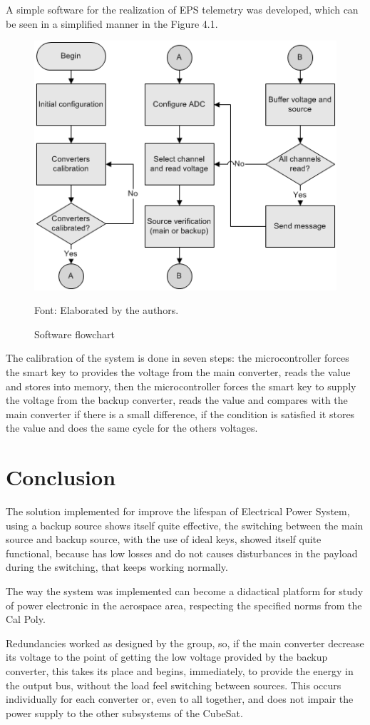 \documentclass[3p]{elsarticle}
\begin{document}
	A simple software for the realization of EPS telemetry was developed, which can be seen in a simplified manner in the Figure 4.1.
	
	\begin{figure}[th]
		\label{flow}
		\centering
		\includegraphics[width=0.4\linewidth]{./figs/fluxo2}
		\caption{Software flowchart}
		
		\begin{footnotesize}
		Font: Elaborated by the authors.
		\end{footnotesize}
	\end{figure}

	The calibration of the system is done in seven steps: the microcontroller forces the smart key to provides the voltage from the main converter, reads the value and stores into memory, then the microcontroller forces the smart key to supply the voltage from the backup converter, reads the value and compares with the main converter if there is a small difference, if the condition is satisfied it stores the value and does the same cycle for the others voltages.

\section{Conclusion}
\label{Conclusion}

	 The solution implemented for improve the lifespan of Electrical Power System, using a backup source shows itself quite effective, the switching between the main source and backup source, with the use of ideal keys, showed itself quite functional, because has low losses and do not causes disturbances in the payload during the switching, that keeps working normally. 
	
	The way the system was implemented can become a didactical platform for study of power electronic in the aerospace area, respecting the specified norms from the Cal Poly.\cite{CubeSat} 

	Redundancies worked as designed by the group, so, if the main converter decrease its voltage to the point of getting the low voltage provided by the backup converter, this takes its place and begins, immediately, to provide the energy in the output bus, without the load feel switching between sources. This occurs individually for each converter or, even to all together, and does not impair the power supply to the other subsystems of the CubeSat.
\end{document}
